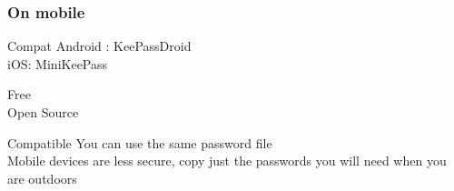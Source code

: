 \documentclass[11pt]{beamer}
\begin{document}
\subsubsection{On mobile}
\begin{frame}{Compat}
Android : KeePassDroid\\
iOS:  MiniKeePass\\
\begin{center}
Free\\
Open Source\\
\end{center}
\end{frame}
\begin{frame}{Compatible}
You can use the same password file\\
Mobile devices are less secure, copy just the passwords you will need when you are outdoors
\end{frame}
\end{document}
